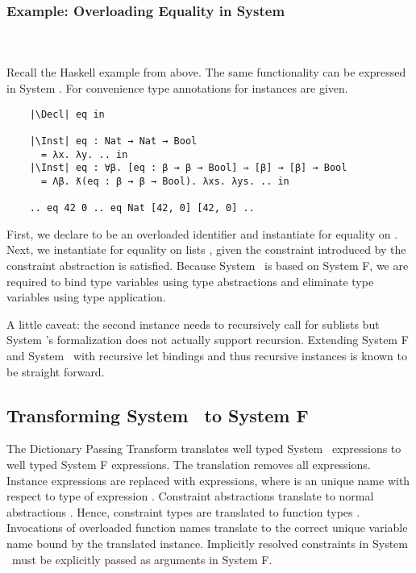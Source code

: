 \subsubsection{Example: Overloading Equality in System \Fo}\hfill\\\\
Recall the Haskell example from above. 
The same functionality can be expressed in System \Fo. 
For convenience type annotations for instances are given.
\begin{verbatim}
    |\Decl| eq in

    |\Inst| eq : Nat → Nat → Bool 
      = λx. λy. .. in
    |\Inst| eq : ∀β. [eq : β → β → Bool] ⇒ [β] → [β] → Bool 
      = Λβ. ƛ(eq : β → β → Bool). λxs. λys. .. in

    .. eq 42 0 .. eq Nat [42, 0] [42, 0] .. 
\end{verbatim} 
First, we declare  to be an overloaded identifier and instantiate  for equality on . 
Next, we instantiate  for equality on lists \inl{[β]}, given the constraint  introduced by the constraint abstraction  is satisfied. 
Because System \Fo\ is based on System F, we are required to bind type variables using type abstractions  and eliminate type variables using type application. 

\noindent A little caveat: the second instance needs to recursively call  for sublists but System \Fo's formalization does not actually support recursion. Extending System F and System \Fo\ with recursive let bindings and thus recursive instances is known to be straight forward. 

\subsection{Transforming System \Fo\ to System F}
The Dictionary Passing Transform translates well typed System \Fo\ expressions to well typed System F expressions. 
The translation removes all  expressions. Instance expressions  are replaced with  expressions, where  is an unique name with respect to type  of expression . 
Constraint abstractions  translate to normal abstractions . 
Hence, constraint types  are translated to function types . 
Invocations of overloaded function names  translate to the correct unique variable name  bound by the translated instance.
Implicitly resolved constraints in System \Fo\ must be explicitly passed as arguments in System F.

